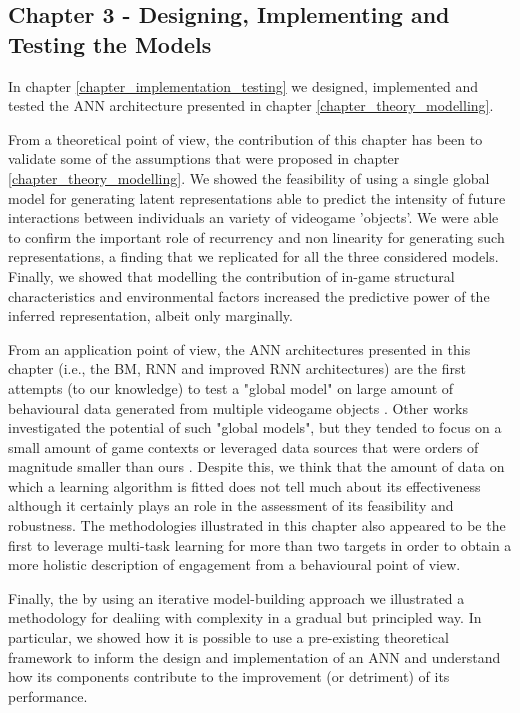\subsection{Chapter 3 - Designing, Implementing and Testing the Models }
\label{discussion_chapter_three}
In chapter \ref{chapter_implementation_testing} we designed, implemented and tested the ANN architecture presented in chapter \ref{chapter_theory_modelling}.

From a theoretical point of view, the contribution of this chapter has been to validate some of the assumptions that were proposed in chapter \ref{chapter_theory_modelling}. We showed the feasibility of using a single global model for generating latent representations able to predict the intensity of future interactions between individuals an variety of videogame 'objects'. We were able to confirm the important role of recurrency and non linearity for generating such representations, a finding that we replicated for all the three considered models. Finally, we showed that modelling the contribution of in-game structural characteristics and environmental factors increased the predictive power of the inferred representation, albeit only marginally. 

From an application point of view, the ANN architectures presented in this chapter (i.e., the BM, RNN and improved RNN architectures) are the first attempts (to our knowledge) to test a "global model" on large amount of behavioural data generated from multiple videogame objects \cite{perianez2016churn, liu2018semi,kristensen2019combining,liu2019micro, roohi2020predicting}. Other works investigated the potential of such "global models", but they tended to focus on a small amount of game contexts \cite{zhao2020multi} or leveraged data sources that were orders of magnitude smaller than ours \cite{liu2019micro, zhao2020multi}. Despite this, we think that the amount of data on which a learning algorithm is fitted does not tell much about its effectiveness although it certainly plays an role in the assessment of its feasibility and robustness. The methodologies illustrated in this chapter also appeared to be the first to leverage multi-task learning for more than two targets \cite{liu2019micro, zhao2020multi}in order to obtain a more holistic description of engagement from a behavioural point of view.

Finally, the by using an iterative model-building approach we illustrated a methodology for dealiing with complexity in a gradual but principled way. In particular, we showed how it is possible to use a pre-existing theoretical framework to inform the design and implementation of an ANN and understand how its components contribute to the improvement (or detriment) of its performance.
